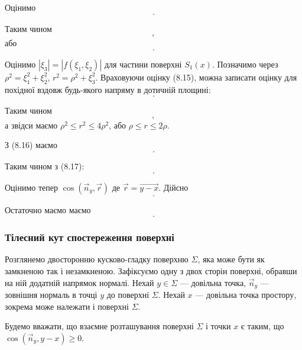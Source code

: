 Оцінимо
\begin{equation}
	.
\end{equation}

Таким чином 
\begin{equation}
	,
\end{equation}
або
\begin{equation}
	.
\end{equation}

Оцінимо $|\xi_3| = |f(\xi_1, \xi_2)|$ для частини поверхні $S_1(x)$. Позначимо через $\rho^2 = \xi_1^2 + \xi_2^2$, $r^2 = \rho^2 + \xi_3^2$. Враховуючи оцінку (8.15), можна записати оцінку для похідної вздовж будь-якого напряму в дотичній площині:
\begin{equation}
	.
\end{equation}

Таким чином
\begin{equation}
	,
\end{equation}
а звідси маємо $\rho^2 \le r^2 \le 4 \rho^2$, або $\rho \le r \le 2 \rho$. \medskip

З (8.16) маємо
\begin{equation}
	.	
\end{equation}

Таким чином з (8.17):
\begin{equation}
	.	
\end{equation}

Оцінимо тепер $\cos(\vec n_y, \vec r)$ де $\vec r = \vec{y - x}$. Дійсно
\begin{equation}
	.
\end{equation}

Остаточно маємо маємо
\begin{equation}
	.
\end{equation}

\subsubsection{Тілесний кут спостереження поверхні}

Розглянемо двосторонню кусково-гладку поверхню $\Sigma$, яка може бути як замкненою так і незамкненою. Зафіксуємо одну з двох сторін поверхні, обравши на ній додатній напрямок нормалі. Нехай $y \in \Sigma$ --- довільна точка, $\vec n_y$ --- зовнішня нормаль в точці $y$ до поверхні $\Sigma$. Нехай $x$ --- довільна точка простору, зокрема може належати і поверхні $\Sigma$. \medskip

Будемо вважати, що взаємне розташування поверхні $\Sigma$ і точки $x$ є таким, що $\cos(\vec n_y, y - x) \ge 0$. \medskip


